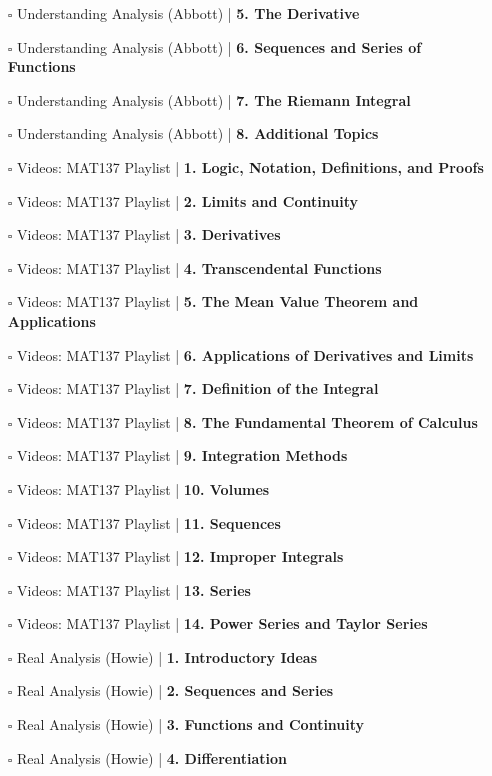 \documentclass[a4, landscape, 12pt]{article}
\newcommand{\checkbox}{$\square$}%
\begin{document}
\begin{itemize}
{}
\item [\checkbox] Understanding Analysis (Abbott)  | \textbf{5. The Derivative
}
\item [\checkbox] Understanding Analysis (Abbott)  | \textbf{6. Sequences and Series of Functions
}
\item [\checkbox] Understanding Analysis (Abbott)  | \textbf{7. The Riemann Integral
}
\item [\checkbox] Understanding Analysis (Abbott)  | \textbf{8. Additional Topics
}
\item [\checkbox] Videos: MAT137 Playlist  | \textbf{1. Logic, Notation, Definitions, and Proofs
}
\item [\checkbox] Videos: MAT137 Playlist  | \textbf{2. Limits and Continuity
}
\item [\checkbox] Videos: MAT137 Playlist  | \textbf{3. Derivatives
}
\item [\checkbox] Videos: MAT137 Playlist  | \textbf{4. Transcendental Functions
}
\item [\checkbox] Videos: MAT137 Playlist  | \textbf{5. The Mean Value Theorem and Applications
}
\item [\checkbox] Videos: MAT137 Playlist  | \textbf{6. Applications of Derivatives and Limits
}
\item [\checkbox] Videos: MAT137 Playlist  | \textbf{7. Definition of the Integral
}
\item [\checkbox] Videos: MAT137 Playlist  | \textbf{8. The Fundamental Theorem of Calculus
}
\item [\checkbox] Videos: MAT137 Playlist  | \textbf{9. Integration Methods
}
\item [\checkbox] Videos: MAT137 Playlist  | \textbf{10. Volumes
}
\item [\checkbox] Videos: MAT137 Playlist  | \textbf{11. Sequences
}
\item [\checkbox] Videos: MAT137 Playlist  | \textbf{12. Improper Integrals
}
\item [\checkbox] Videos: MAT137 Playlist  | \textbf{13. Series
}
\item [\checkbox] Videos: MAT137 Playlist  | \textbf{14. Power Series and Taylor Series
}
\item [\checkbox] Real Analysis (Howie)  | \textbf{1. Introductory Ideas
}
\item [\checkbox] Real Analysis (Howie)  | \textbf{2. Sequences and Series
}
\item [\checkbox] Real Analysis (Howie)  | \textbf{3. Functions and Continuity
}
\item [\checkbox] Real Analysis (Howie)  | \textbf{4. Differentiation
}
\end{itemize}
\end{document}
